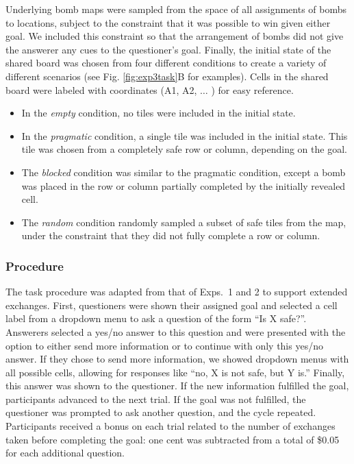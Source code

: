 \documentclass[11pt, floatsintext]{apa6}
\begin{document}
Underlying bomb maps were sampled from the space of all assignments of bombs to locations,  subject to the constraint that it was possible to win given either goal. 
We included this constraint so that the arrangement of bombs did not give the answerer any cues to the questioner's goal.
Finally, the initial state of the shared board was chosen from four different conditions to create a variety of different scenarios (see Fig. \ref{fig:exp3task}B for examples).
Cells in the shared board were labeled with coordinates (A1, A2, $\dots$ ) for easy reference.
\begin{itemize}
\item In the \emph{empty} condition, no tiles were included in the initial state.
\item In the \emph{pragmatic} condition, a single tile was included in the initial state. This tile was chosen from a completely safe row or column, depending on the goal.%
\item The \emph{blocked} condition was similar to the pragmatic condition, except a bomb was placed in the row or column partially completed by the initially revealed cell. %
\item The \emph{random} condition randomly sampled a subset of safe tiles from the map, under the constraint that they did not fully complete a row or column. 
\end{itemize}

\subsubsection{Procedure}

The task procedure was adapted from that of Exps.~1 and 2 to support extended exchanges. 
First, questioners were shown their assigned goal and selected a cell label from a dropdown menu to ask a question of the form ``Is X safe?''. 
Answerers selected a yes/no answer to this question and were presented with the option to either send more information or to continue with only this yes/no answer.
If they chose to send more information, we showed dropdown menus with all possible cells, allowing for responses like ``no, X is not safe, but Y is.''
Finally, this answer was shown to the questioner.
If the new information fulfilled the goal, participants advanced to the next trial.
If the goal was not fulfilled, the questioner was prompted to ask another question, and the cycle repeated.
Participants received a bonus on each trial related to the number of exchanges taken before completing the goal: one cent was subtracted from a total of \$0.05 for each additional question.%
\end{document}
